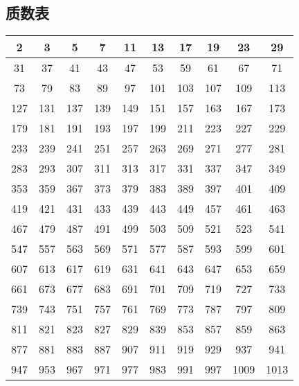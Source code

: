 \documentclass[a4paper,landscape,twocolumn]{ctexart}
\begin{document}
\subsection{质数表}

\begin{tabular}{|c|c|c|c|c|c|c|c|c|c|}
\hline
2 & 3 & 5 & 7 & 11 & 13 & 17 & 19 & 23 & 29\\
\hline
31 & 37 & 41 & 43 & 47 & 53 & 59 & 61 & 67 & 71\\
\hline
73 & 79 & 83 & 89 & 97 & 101 & 103 & 107 & 109 & 113\\
\hline
127 & 131 & 137 & 139 & 149 & 151 & 157 & 163 & 167 & 173\\
\hline
179 & 181 & 191 & 193 & 197 & 199 & 211 & 223 & 227 & 229\\
\hline
233 & 239 & 241 & 251 & 257 & 263 & 269 & 271 & 277 & 281\\
\hline
283 & 293 & 307 & 311 & 313 & 317 & 331 & 337 & 347 & 349\\
\hline
353 & 359 & 367 & 373 & 379 & 383 & 389 & 397 & 401 & 409\\
\hline
419 & 421 & 431 & 433 & 439 & 443 & 449 & 457 & 461 & 463\\
\hline
467 & 479 & 487 & 491 & 499 & 503 & 509 & 521 & 523 & 541\\
\hline
547 & 557 & 563 & 569 & 571 & 577 & 587 & 593 & 599 & 601\\
\hline
607 & 613 & 617 & 619 & 631 & 641 & 643 & 647 & 653 & 659\\
\hline
661 & 673 & 677 & 683 & 691 & 701 & 709 & 719 & 727 & 733\\
\hline
739 & 743 & 751 & 757 & 761 & 769 & 773 & 787 & 797 & 809\\
\hline
811 & 821 & 823 & 827 & 829 & 839 & 853 & 857 & 859 & 863\\
\hline
877 & 881 & 883 & 887 & 907 & 911 & 919 & 929 & 937 & 941\\
\hline
947 & 953 & 967 & 971 & 977 & 983 & 991 & 997 & 1009 & 1013\\
\hline
\end{tabular}


%
%
\end{document}
